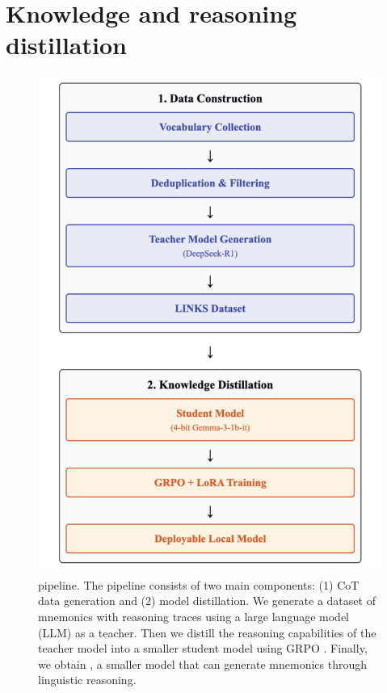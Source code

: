 
\section{Knowledge and reasoning distillation} \label{sec:distillation}

\begin{figure}[htb]
  \centering
  \includegraphics[width=\linewidth]{figures/pipeline.pdf}
  \caption{\linksys pipeline. The pipeline consists of two main components: (1) CoT data generation and (2) model distillation. We generate a dataset of mnemonics with reasoning traces using a large language model (LLM) as a teacher. Then we distill the reasoning capabilities of the teacher model into a smaller student model using GRPO . Finally, we obtain \linksys, a smaller model that can generate mnemonics through linguistic reasoning.}
  \label{fig:distillation}
\end{figure}

